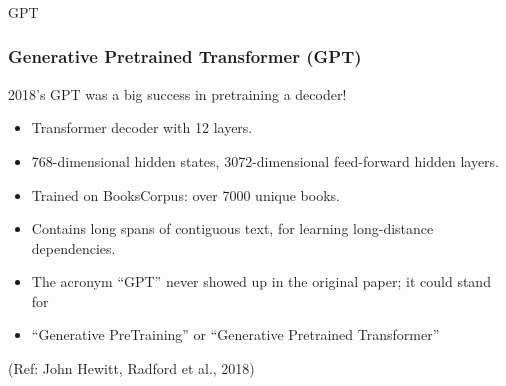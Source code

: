 \begin{frame}[fragile]\frametitle{}
\begin{center}
{\Large GPT}
\end{center}
\end{frame}


\begin{frame}[fragile]\frametitle{Generative Pretrained Transformer (GPT)}



2018’s GPT was a big success in pretraining a decoder!


      \begin{itemize}
			\item Transformer decoder with 12 layers.
			\item 768-dimensional hidden states, 3072-dimensional feed-forward hidden layers.
			\item Trained on BooksCorpus: over 7000 unique books.
			\item Contains long spans of contiguous text, for learning long-distance dependencies.
			\item The acronym ``GPT'' never showed up in the original paper; it could stand for
			\item ``Generative PreTraining'' or ``Generative Pretrained Transformer''
			\end{itemize}

			
			{\tiny (Ref: John Hewitt, Radford et al., 2018)}

\end{frame}


